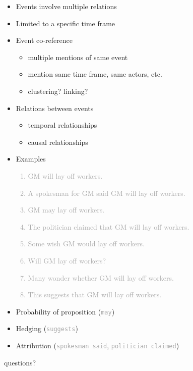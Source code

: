 \documentclass[landscape]{jhuslides3C}
\begin{document}

\vfill
\begin{itemize}
\item Events involve multiple relations
\item Limited to a specific time frame
\item Event co-reference
\begin{itemize}
\item multiple mentions of same event
\item mention same time frame, same actors, etc.
\item clustering? linking?
\end{itemize}
\item Relations between events
\begin{itemize}
\item temporal relationships
\item causal relationships
\end{itemize}
\end{itemize}
\vfill


\vfill
\begin{itemize}\itemsep 2mm
\item Examples
\textcolor{darkgrey}{\begin{enumerate}\itemsep 0mm \tt
\item GM will lay off workers.
\item A spokesman for GM said GM will lay off workers.
\item GM may lay off workers.
\item The politician claimed that GM will lay off workers. 
\item Some wish GM would lay off workers.
\item Will GM lay off workers?
\item Many wonder whether GM will lay off workers.
\item This suggests that GM will lay off workers.
\end{enumerate}}
\item Probability of proposition (\textcolor{darkgrey}{\tt may})
\item Hedging (\textcolor{darkgrey}{\tt suggests})
\item Attribution (\textcolor{darkgrey}{\tt spokesman said}, \textcolor{darkgrey}{\tt politician claimed})
\end{itemize}
\vfill


\slide{}
\vspace{85mm}
\begin{center}
{\huge questions?}
\end{center}

\end{document}
